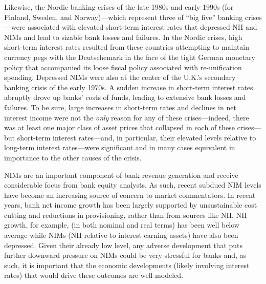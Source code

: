 \documentclass[11pt]{article}
\begin{document}
Likewise, the Nordic banking crises of the late 1980s and early 1990s (for Finland, Sweden, and Norway)---which represent three of  ``big five'' banking crises---were associated with elevated short-term interest rates that depressed NII and NIMs and lead to sizable bank losses and failures. In the Nordic crises, high short-term interest rates resulted from these countries attempting to maintain currency pegs with the Deutschemark in the face of the tight German monetary policy that accompanied its loose fiscal policy associated with re-unification spending. Depressed NIMs were also at the center of the U.K.'s secondary banking crisis of the early 1970s. A sudden increase in short-term interest rates abruptly drove up banks' costs of funds,  leading to extensive bank losses and failures.  To be sure, large increases in short-term rates and declines in net interest income were not the \textit{only} reason for any of these crises---indeed, there was at least one major class of asset prices that collapsed in each of these crises---but short-term interest rates---and, in particular, their elevated levels relative to long-term interest rates---were significant and in many cases equivalent in importance to the other causes of the crisis.

NIMs are an important component of bank revenue generation and receive considerable focus from bank equity analysts. As such, recent subdued NIM levels have become an increasing source of concern to market commentators. In recent years, bank net income growth has been largely supported by unsustainable cost cutting and reductions in provisioning, rather than from sources like NII.  NII growth, for example, (in both nominal and real terms) has been well below average while NIMs (NII relative to interest earning assets) have also been depressed. Given their already low level, any adverse development that puts further downward pressure on NIMs could be very stressful for banks and, as such, it is important that the economic developments (likely involving interest rates) that would drive these outcomes are well-modeled. 
\end{document}
